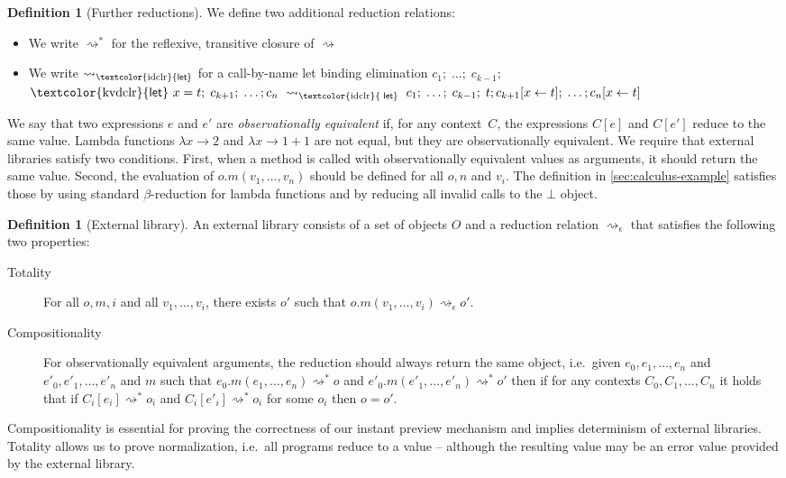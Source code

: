 \documentclass[english,crc,references=cleveref]{programming}
\newcounter{dfc}
\theoremstyle{plain}
\theoremstyle{definition}
\newtheorem{definition}[dfc]{Definition}
\newcommand{\ident}[1]{\textnormal{\textcolor{idclr}{\sffamily #1}}}
\newcommand{\kvd}[1]{\textnormal{\textcolor{kvdclr}{\sffamily #1}}}
\begin{document}
\begin{definition}[Further reductions]
\label{def:further-red}
We define two additional reduction relations:
\begin{itemize}
\item We write $\rightsquigarrow^{*}$ for the reflexive, transitive closure of $\rightsquigarrow$
\item We write $\rightsquigarrow_\ident{let}$ for a call-by-name let binding elimination
  $c_1;\; \ldots;\; c_{k-1};\;$\\ $\kvd{let}~x=t;\; c_{k+1};\; \ldots; c_n ~\rightsquigarrow_\ident{let}~
  c_1;\; \ldots;\; c_{k-1};\; t; c_{k+1}[x\leftarrow t];\; \ldots; c_n[x\leftarrow t]$
\end{itemize}
\end{definition}
%
%
We say that two expressions
$e$ and $e'$ are \emph{observationally equivalent} if, for any context~$C$, the expressions $C[e]$ and
$C[e']$ reduce to the same value. Lambda functions $\lambda x\!\rightarrow\!2$ and
$\lambda x\!\rightarrow\!1\!+\!1$ are not equal, but they are observationally equivalent.
We require that external libraries satisfy two conditions. First, when a method is called with
observationally equivalent values as arguments, it should return the same value. Second, the
evaluation of $o.m(v_1,\ldots,v_n)$ should be defined for all $o, n$ and $v_i$.
The definition in \cref{sec:calculus-example} satisfies those by using standard
$\beta$-reduction for lambda functions and by reducing all invalid calls to the $\bot$ object.

\begin{definition}[External library]
\label{def:external}
An external library consists of a set of objects $O$ and a reduction relation
$\rightsquigarrow_\epsilon$ that satisfies the following two properties:
\begin{description}
\item [Totality] For all $o, m, i$ and all $v_1, \ldots, v_i$, there exists $o'$ such
  that $o.m(v_1, \ldots, v_i) \rightsquigarrow_\epsilon o'$.
\item[Compositionality] For observationally equivalent arguments, the reduction should always return
  the same object, i.\hairspace e.~given $e_0, e_1, \ldots, e_n$ and $e'_0, e'_1, \ldots, e'_n$ and $m$ such that
  $e_0.m(e_1, \ldots, e_n) \rightsquigarrow^{*} o$ and $e'_0.m(e'_1, \ldots, e'_n) \rightsquigarrow^{*} o'$ then
  if for any contexts $C_0, C_1, \ldots, C_n$ it holds that if $C_i[e_i] \rightsquigarrow^{*} o_i$ and
  $C_i[e'_i] \rightsquigarrow^{*} o_i$ for some $o_i$ then $o = o'$.
\end{description}
\end{definition}
%
%
Compositionality is essential for proving the correctness of our instant preview mechanism and
implies determinism of external libraries.
Totality allows us to prove normalization, i.\hairspace e.~all programs reduce to
a value -- although the resulting value may be an error value provided by the external library.
\end{document}
